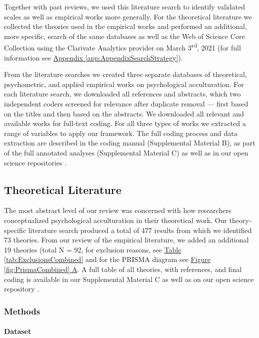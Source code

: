 \documentclass[man, 12pt, a4paper, mask]{apa7}
\newcommand{\fgrref}[2][]{\hyperref[#2]{Figure \ref*{#2}#1}}
\newcommand{\tblref}[2][]{\hyperref[#2]{Table \ref*{#2}#1}}
\begin{document}
Together with past reviews, we used this literature search to identify
validated scales as well as empirical works more generally. For the
theoretical literature we collected the theories used in the empirical
works and performed an additional, more specific, search of the same
databases as well as the Web of Science Core Collection using the
Clarivate Analytics provider on March 3\textsuperscript{rd}, 2021 (for
full information see
\hyperref[app:AppendixSearchStrategy]{Appendix \ref*{app:AppendixSearchStrategy}}).

From the literature searches we created three separate databases of
theoretical, psychometric, and applied empirical works on psychological
acculturation. For each literature search, we downloaded all references
and abstracts, which two independent coders screened for relevance after
duplicate removal --- first based on the titles and then based on the
abstracts. We downloaded all relevant and available works for full-text
coding. For all three types of works we extracted a range of variables
to apply our framework. The full coding process and data extraction are
described in the coding manual (Supplemental Material B), as part of the
full annotated analyses (Supplemental Material C) as well as in our open
science repositories \citep[see][]{Kreienkamp2021d, Kreienkamp2021e}.

\subsection{Theoretical Literature}

The most abstract level of our review was concerned with how researchers
conceptualized psychological acculturation in their theoretical work.
Our theory-specific literature search produced a total of 477 results
from which we identified 73 theories. From our review of the empirical
literature, we added an additional 19 theories (total N = 92, for
exclusion reasons, see \tblref{tab:ExclusionsCombined} and for the
PRISMA diagram see \fgrref[ A]{fig:PrismaCombined}. A full table of all
theories, with references, and final coding is available in our
Supplemental Material C as well as on our open science repository
\citep[see][]{Kreienkamp2021d, Kreienkamp2021e}.



\subsubsection{Methods}
\paragraph{Dataset}
\end{document}
